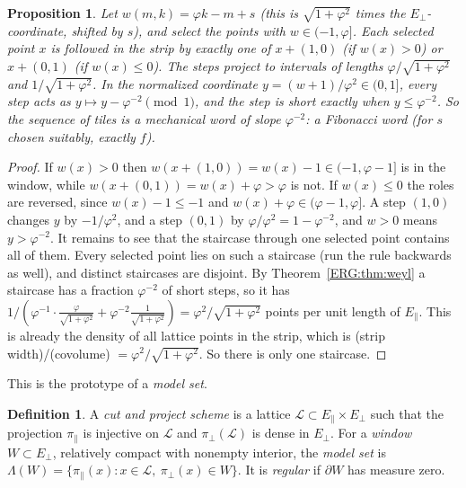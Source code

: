 \documentclass[11pt,openany]{book}
\theoremstyle{plain}
\newtheorem{proposition}[theorem]{Proposition}
\theoremstyle{definition}
\newtheorem{definition}[theorem]{Definition}
\theoremstyle{remark}
\begin{document}
\begin{proposition}\label{ERG:prop:fibchain}
Let $w(m,k)=\varphi k-m+s$ (this is $\sqrt{1+\varphi^2}$ times the $E_\perp$-coordinate, shifted by
$s$), and select the points with $w\in(-1,\varphi]$. Each selected point $x$ is followed in the strip by
exactly one of $x+(1,0)$ (if $w(x)>0$) or $x+(0,1)$ (if $w(x)\le0$). The steps project to intervals of
lengths $\varphi/\sqrt{1+\varphi^2}$ and $1/\sqrt{1+\varphi^2}$. In the normalized coordinate
$y=(w+1)/\varphi^2\in(0,1]$, every step acts as $y\mapsto y-\varphi^{-2}\pmod1$, and the step is short
exactly when $y\le\varphi^{-2}$. So the sequence of tiles is a mechanical word of slope $\varphi^{-2}$:
a Fibonacci word (for $s$ chosen suitably, exactly $f$).
\end{proposition}

\begin{proof}
If $w(x)>0$ then $w(x+(1,0))=w(x)-1\in(-1,\varphi-1]$ is in the window, while $w(x+(0,1))=w(x)+\varphi>\varphi$
is not. If $w(x)\le0$ the roles are reversed, since $w(x)-1\le-1$ and $w(x)+\varphi\in(\varphi-1,\varphi]$.
A step $(1,0)$ changes $y$ by $-1/\varphi^2$, and a step $(0,1)$ by $\varphi/\varphi^2=1-\varphi^{-2}$,
and $w>0$ means $y>\varphi^{-2}$. It remains to see that the staircase through one selected point
contains all of them. Every selected point lies on such a staircase (run the rule backwards as well), and
distinct staircases are disjoint. By Theorem~\ref{ERG:thm:weyl} a staircase has a fraction
$\varphi^{-2}$ of short steps, so it has $1/(\varphi^{-1}\cdot\frac{\varphi}{\sqrt{1+\varphi^2}}+
\varphi^{-2}\frac{1}{\sqrt{1+\varphi^2}})=\varphi^2/\sqrt{1+\varphi^2}$ points per unit length of
$E_\parallel$. This is already the density of all lattice points in the strip, which is (strip width)/(covolume) $=\varphi^2/\sqrt{1+\varphi^2}$. So there is only one staircase.
\end{proof}

This is the prototype of a \emph{model set}.

\begin{definition}
A \emph{cut and project scheme} is a lattice $\mathcal L\subset E_\parallel\times E_\perp$ such that the
projection $\pi_\parallel$ is injective on $\mathcal L$ and $\pi_\perp(\mathcal L)$ is dense in
$E_\perp$. For a \emph{window} $W\subset E_\perp$, relatively compact with nonempty interior, the
\emph{model set} is $\Lambda(W)=\{\pi_\parallel(x):x\in\mathcal L,\ \pi_\perp(x)\in W\}$. It is
\emph{regular} if $\partial W$ has measure zero.
\end{definition}
\end{document}
